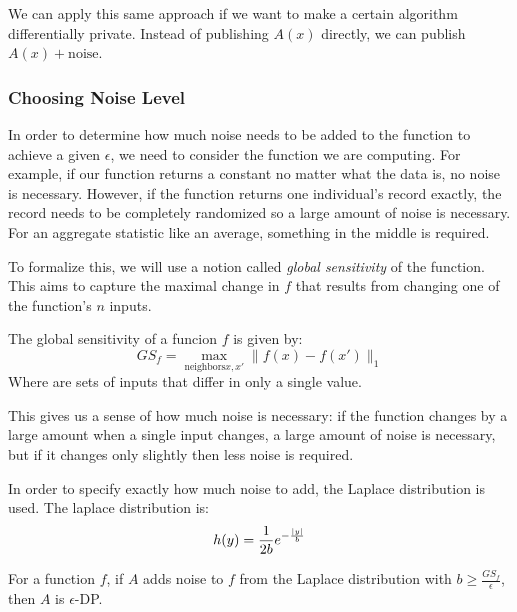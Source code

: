 We can apply this same approach if we want to make a certain algorithm differentially private. Instead of publishing $A(x)$ directly, we can publish $A(x) + \text{noise}$.

\subsubsection{Choosing Noise Level}
In order to determine how much noise needs to be added to the function to achieve a given $\epsilon$, we need to consider the function we are computing. For example, if our function returns a constant no matter what the data is, no noise is necessary. However, if the function returns one individual's record exactly, the record needs to be completely randomized so a large amount of noise is necessary. For an aggregate statistic like an average, something in the middle is required. 

To formalize this, we will use a notion called \emph{global sensitivity} of the function. This aims to capture the maximal change in $f$ that results from changing one of the function's $n$ inputs.

\begin{definition}
	The global sensitivity of a funcion $f$ is given by:
	\[ GS_f = \max_{\text{neighbors} x, x'} \| f(x) - f(x') \|_1 \]
	Where  are sets of inputs that differ in only a single value.
\end{definition}

This gives us a sense of how much noise is necessary: if the function changes by a large amount when a single input changes, a large amount of noise is necessary, but if it changes only slightly then less noise is required.

In order to specify exactly how much noise to add, the Laplace distribution is used. The laplace distribution is:
\[ h(y) = \frac{1}{2b} e^{-\frac{\left| y \right|}{b}} \]

\begin{thm}
For a function $f$, if $A$ adds noise to $f$ from the Laplace distribution with $b \geq \frac{GS_f}{\epsilon}$, then $A$ is $\epsilon$-DP.
\end{thm}



